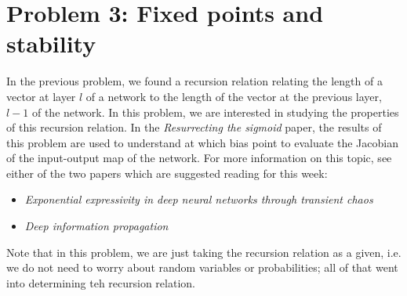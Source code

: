 \documentclass[a4paper]{article}
\begin{document}
\section*{Problem 3: Fixed points and stability}

In the previous problem, we found a recursion relation relating the length of a vector at layer $l$ of a network to the length of the vector at the previous layer, $l-1$ of the network.  In this problem, we are interested in studying the properties of this recursion relation.  In the \emph{Resurrecting the sigmoid} paper, the results of this problem are used to understand at which bias point to evaluate the Jacobian of the input-output map of the network.  For more information on this topic, see either of the two papers which are suggested reading for this week:
\begin{itemize}
	\item \emph{Exponential expressivity in deep neural networks through transient chaos}
	\item \emph{Deep information propagation}
\end{itemize} 

Note that in this problem, we are just taking the recursion relation as a given, i.e. we do not need to worry about random variables or probabilities; all of that went into determining teh recursion relation.  
\end{document}
